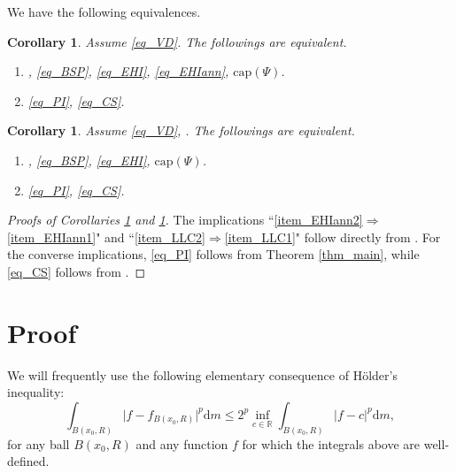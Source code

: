 \documentclass[11pt,a4paper]{article}
\numberwithin{equation}{section}
\theoremstyle{plain}
\newtheorem{corollary}[theorem]{Corollary}
\theoremstyle{definition}
\begin{document}
We have the following equivalences.

\begin{corollary}\label{cor_EHIann}
Assume \ref{eq_VD}. The followings are equivalent.
\begin{enumerate}[label=(\arabic*),ref=(\arabic*)]
\item\label{item_EHIann1} \hyperlink{eq_LSC}{}, \ref{eq_BSP}, \ref{eq_EHI}, \ref{eq_EHIann}, \hyperlink{eq_cap}{$\text{cap}(\Psi)$}.
\item\label{item_EHIann2} \ref{eq_PI}, \ref{eq_CS}.
\end{enumerate}
\end{corollary}

\begin{corollary}\label{cor_LLC}
Assume \ref{eq_VD}, \hyperlink{eq_LLC}{}. The followings are equivalent.
\begin{enumerate}[label=(\roman*),ref=(\roman*)]
\item\label{item_LLC1} \hyperlink{eq_LSC}{}, \ref{eq_BSP}, \ref{eq_EHI}, \hyperlink{eq_cap}{$\text{cap}(\Psi)$}.
\item\label{item_LLC2} \ref{eq_PI}, \ref{eq_CS}.
\end{enumerate}
\end{corollary}

\begin{proof}[Proofs of Corollaries \ref{cor_EHIann} and \ref{cor_LLC}]
The implications ``\ref{item_EHIann2}$\Rightarrow$\ref{item_EHIann1}" and ``\ref{item_LLC2}$\Rightarrow$\ref{item_LLC1}" follow directly from \cite[Theorem 2.3]{Yan25d}. For the converse implications, \ref{eq_PI} follows from Theorem \ref{thm_main}, while \ref{eq_CS} follows from \cite[Theorem 2.1]{Yan25d}.
\end{proof}


\section{Proof}\label{sec_proof}

We will frequently use the following elementary consequence of H\"older's inequality:
\begin{equation}\label{eq_ele}
\int_{B(x_0,R)}\lvert f-f_{B(x_0,R)}\rvert^p \mathrm{d}m\le 2^p\inf_{c\in \mathbb{R}}\int_{B(x_0,R)}\lvert f-c\rvert^p \mathrm{d}m,
\end{equation}
for any ball $B(x_0,R)$ and any function $f$ for which the integrals above are well-defined.
\end{document}
